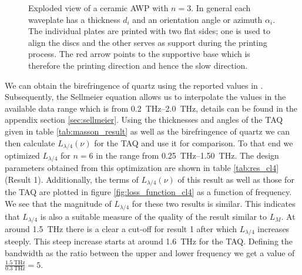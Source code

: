 \begin{figure}[ht]
    \centering
    
    \caption{Exploded view of a ceramic AWP with $n=3$. In general each waveplate has a thickness $d_i$ and an orientation angle or azimuth $\alpha_i$. The individual plates are printed with two flat sides; one is used to align the discs and the other serves as support during the printing process. The red arrow points to the supportive base which is therefore the printing direction and hence the slow direction.}
    \label{fig:ceramic_stack}
\end{figure}


We can obtain the birefringence of quartz using the reported values in \cite{DGrischkowsky1990}. Subsequently, the Sellmeier equation allows us to interpolate the values in the available data range which is from \SIrange{0.2}{2.0}{\tera \hertz}, details can be found in the appendix section \ref{sec:sellmeier}. Using the thicknesses and angles of the TAQ given in table \ref{tab:masson_result} as well as the birefringence of quartz we can then calculate $L_{\lambda/4}(\nu)$ for the TAQ and use it for comparison. To that end we optimized $L_{\lambda/4}$ for $n=6$ in the range from \SIrange{0.25}{1.50}{\tera \hertz}. The design parameters obtained from this optimization are shown in table \ref{tab:res_cl4} (Result 1). Additionally, the terms of $L_{\lambda/4}(\nu)$ of this result as well as those for the TAQ are plotted in figure \ref{fig:loss_function_cl4} as a function of frequency. We see that the magnitude of $L_{\lambda/4}$ for these two results is similar. This indicates that $L_{\lambda/4}$ is also a suitable measure of the quality of the result similar to $L_{M}$. At around \SI{1.5}{\tera \hertz} there is a clear a cut-off for result 1 after which $L_{\lambda/4}$ increases steeply. This steep increase starts at around \SI{1.6}{\tera \hertz} for the TAQ. Defining the bandwidth as the ratio between the upper and lower frequency we get a value of  $\frac{\SI{1.5}{\tera \hertz}}{\SI{0.3}{\tera \hertz}}=5$. 

\begin{table}[ht]
    \centering
    
    \caption{Design parameters for result 1 and 2. Both results are obtained through the optimization of $L_{\lambda/4}$ for $n=6$. In the case of result 1 the frequency range for the optimization was limited to \SIrange[range-phrase=-, range-units=single]{0.25}{1.50}{\tera \hertz} while for result 2 the range was set to \SIrange[range-phrase=-, range-units=single]{0.50}{2.25}{\tera \hertz}.}
    \label{tab:res_cl4}
\end{table}

